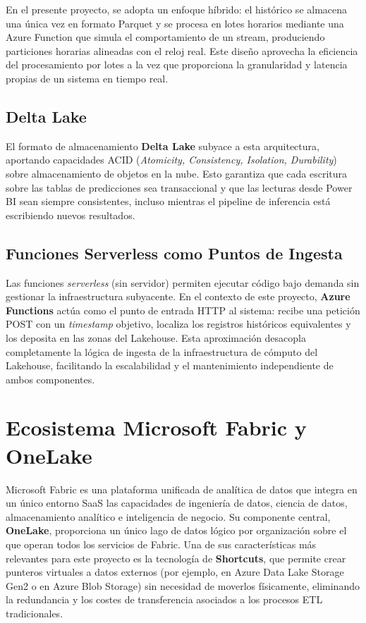 \documentclass[12pt,oneside,a4paper]{report}
\renewcommand{\_}{\textunderscore\allowbreak}
\begin{document}
En el presente proyecto, se adopta un enfoque híbrido: el histórico se almacena una única vez en formato Parquet y se procesa en lotes horarios mediante una Azure Function que simula el comportamiento de un stream, produciendo particiones horarias alineadas con el reloj real. Este diseño aprovecha la eficiencia del procesamiento por lotes a la vez que proporciona la granularidad y latencia propias de un sistema en tiempo real.

\subsection{Delta Lake}

 El formato de almacenamiento \textbf{Delta Lake} subyace a esta arquitectura, aportando capacidades ACID (\textit{Atomicity, Consistency, Isolation, Durability}) sobre almacenamiento de objetos en la nube. Esto garantiza que cada escritura sobre las tablas de predicciones sea transaccional y que las lecturas desde Power BI sean siempre consistentes, incluso mientras el pipeline de inferencia está escribiendo nuevos resultados.

\subsection{Funciones Serverless como Puntos de Ingesta}

Las funciones \textit{serverless} (sin servidor) permiten ejecutar código bajo demanda sin gestionar la infraestructura subyacente. En el contexto de este proyecto, \textbf{Azure Functions} actúa como el punto de entrada HTTP al sistema: recibe una petición POST con un \textit{timestamp} objetivo, localiza los registros históricos equivalentes y los deposita en las zonas del Lakehouse. Esta aproximación desacopla completamente la lógica de ingesta de la infraestructura de cómputo del Lakehouse, facilitando la escalabilidad y el mantenimiento independiente de ambos componentes.

\section{Ecosistema Microsoft Fabric y OneLake}

Microsoft Fabric es una plataforma unificada de analítica de datos que integra en un único entorno SaaS las capacidades de ingeniería de datos, ciencia de datos, almacenamiento analítico e inteligencia de negocio. Su componente central, \textbf{OneLake}, proporciona un único lago de datos lógico por organización sobre el que operan todos los servicios de Fabric. Una de sus características más relevantes para este proyecto es la tecnología de \textbf{Shortcuts}, que permite crear punteros virtuales a datos externos (por ejemplo, en Azure Data Lake Storage Gen2 o en Azure Blob Storage) sin necesidad de moverlos físicamente, eliminando la redundancia y los costes de transferencia asociados a los procesos ETL tradicionales.
\end{document}
